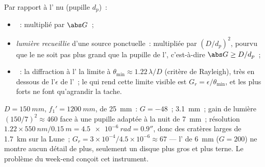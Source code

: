 \begin{proposition}\label{prop:b1:optical-instruments:gains}
Par rapport à l' nu (pupille $d_p$)~:
\begin{itemize}
  \item \emph{}~: multiplié par $\abs G$~;
  \item \emph{lumière recueillie} d'une source ponctuelle~: multipliée
        par $(D/d_p)^2$, pourvu que le  ne soit pas plus
        grand que la pupille de l', c'est-à-dire $\abs G \geq D/d_p$~;
  \item \emph{}~: la diffraction à l' la
        limite à $\theta_{\min} \approx 1.22\,\lambda/D$ (critère de
        Rayleigh), très en dessous de l'$\epsilon$ de l'~; le
         qui rend cette limite visible est
        $G_r = \epsilon/\theta_{\min}$, et les  plus forts
        ne font qu'agrandir la tache.
\end{itemize}
\end{proposition}
\admitted

\begin{example}\label{ex:b1:optical-instruments:telnum}
$D = \qty{150}{mm}$, $f_1' = \qty{1200}{mm}$,  de \qty{25}{mm}~:
$G = -48$~;  \qty{3.1}{mm}~; gain de lumière $(150/7)^2 \approx
460$ face à une pupille adaptée à la nuit de \qty{7}{mm}~; résolution $1.22 \times
\qty{550}{nm}/\qty{0.15}{m} = \qty{4.5e-6}{rad} = 0.9''$, donc des
cratères larges de \qty{1.7}{km} sur la Lune~; $G_r = 3\times10^{-4}/4.5\times
10^{-6} \approx 67$ --- l' de \qty{6}{mm} ($G = 200$) ne montre
aucun détail de plus, seulement un disque plus gros et plus terne. Le
problème du week-end conçoit cet instrument.
\end{example}

